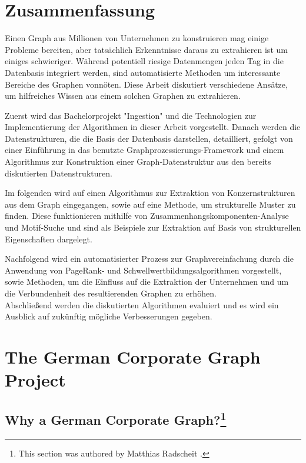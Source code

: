\documentclass[
        a4paper,     %
        titlepage,   %
        oneside,     %
        parskip      %
]{scrartcl}          %
\begin{document}
  \section*{Zusammenfassung}
  { \large
    Einen Graph aus Millionen von Unternehmen zu konstruieren mag einige Probleme
    bereiten, aber tats\"achlich Erkenntnisse daraus zu extrahieren ist um einiges schwieriger.
    W\"ahrend potentiell riesige Datenmengen jeden Tag in die Datenbasis integriert werden,
    sind automatisierte Methoden um interessante Bereiche des Graphen vonn\"oten.
    Diese Arbeit diskutiert verschiedene Ans\"atze, um hilfreiches Wissen aus einem solchen Graphen zu extrahieren.

    Zuerst wird das Bachelorprojekt "Ingestion" und die Technologien zur Implementierung
    der Algorithmen in dieser Arbeit vorgestellt. Danach werden die Datenstrukturen, die die Basis der
    Datenbasis darstellen, detailliert, gefolgt von einer Einf\"uhrung in das benutzte
    Graphprozessierungs-Framework und einem Algorithmus zur Konstruktion einer Graph-Datenstruktur
    aus den bereits diskutierten Datenstrukturen.

    Im folgenden wird auf einen Algorithmus zur Extraktion von Konzernstrukturen aus dem Graph eingegangen,
    sowie auf eine Methode, um strukturelle Muster zu finden. Diese funktionieren
    mithilfe von Zusammenhangskomponenten-Analyse und Motif-Suche und sind als
    Beispiele zur Extraktion auf Basis von strukturellen Eigenschaften dargelegt.

    Nachfolgend wird ein automatisierter Prozess zur Graphvereinfachung durch die
    Anwendung von PageRank- und Schwellwertbildungsalgorithmen vorgestellt, sowie
    Methoden, um die Einfluss auf die Extraktion der Unternehmen und um die Verbundenheit
    des resultierenden Graphen zu erh\"ohen.\\
    Abschlie{\ss}end werden die diskutierten Algorithmen evaluiert
    und es wird ein Ausblick auf zuk\"unftig m\"ogliche Verbesserungen gegeben.
  }
  \clearpage

  \tableofcontents
  \pagebreak

  \section{The German Corporate Graph Project}
    \subsection[Why a German Corporate Graph?]{Why a German Corporate Graph?\footnote{This section was authored by Matthias Radscheit \cite{loeperradscheit}.}}
\end{document}
